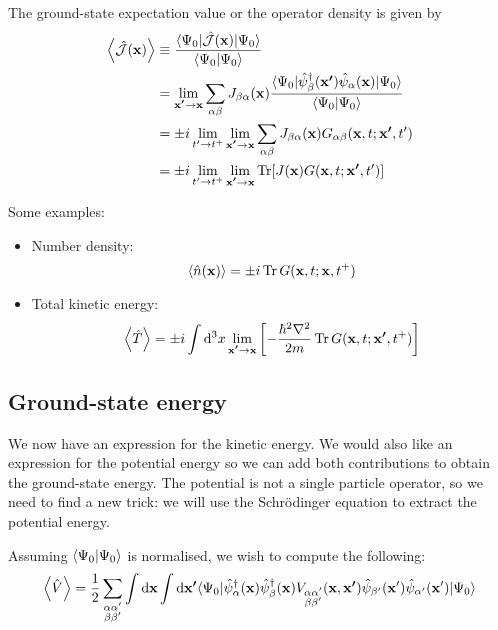The ground-state expectation value or the operator density is given by
\begin{align*}
\expval{\hat{\mathcal{J}}(\vec{x})} &\equiv \frac{\braket[\hat{\mathcal{J}}(\vec{x})]{\Psi_0}{\Psi_0}}{\braket{\Psi_0}{\Psi_0}} \\
&= \lim_{\vec{x'}\to \vec{x}}\sum_{\alpha\beta}J_{\beta\alpha}(\vec{x}) \frac{\braket[\hat{\psi}^\dagger_\beta(\vec{x'})\hat{\psi}_\alpha(\vec{x})]{\Psi_0}{\Psi_0}}{\braket{\Psi_0}{\Psi_0}} \\
&= \pm i \lim_{t'\to t^+}\lim_{\vec{x'}\to \vec{x}} \sum_{\alpha\beta}J_{\beta\alpha}(\vec{x})G_{\alpha\beta}(\vec{x},t; \vec{x'},t') \\
&=  \pm i \lim_{t'\to t^+}\lim_{\vec{x'}\to \vec{x}} \Tr[J(\vec{x})G(\vec{x},t; \vec{x'},t')]
\end{align*}

Some examples:
\begin{itemize}
\item Number density:
\[ \left\langle \hat{n}(\bm{\mathrm{x}}) \right\rangle = \pm i\operatorname{Tr} G(\bm{\mathrm{x}},t;\bm{\mathrm{x}},t^+) \]
\item Total kinetic energy:
\[ \left\langle \hat{T} \right\rangle = \pm i \int \operatorname{d \!}{^3x}\lim_{\bm{\mathrm{x'}}\to \bm{\mathrm{x}}}\left[- \frac{\hbar^2\nabla^2}{2m}\operatorname{Tr} G(\bm{\mathrm{x}},t;\bm{\mathrm{x'}},t^+)\right] \]
\end{itemize}

\subsection{Ground-state energy}
We now have an expression for the kinetic energy. We would also like an expression for the potential energy so we can add both contributions to obtain the ground-state energy. The potential is not a single particle operator, so we need to find a new trick: we will use the Schrödinger equation to extract the potential energy.

Assuming $\braket{\Psi_0}{\Psi_0}$ is normalised, we wish to compute the following:
\begin{align*}
\expval{\hat{V}} = \frac{1}{2} \sum_{\substack{\alpha \alpha' \\ \beta \beta'}}\int \diff{\vec{x}}\int \diff{\vec{x'}} \braket[\hat{\psi}_{\alpha}^\dagger(\vec{x})\hat{\psi}^\dagger_\beta(\vec{x})V_{\substack{\alpha\alpha' \\ \beta \beta'}}(\vec{x}, \vec{x'})\hat{\psi}_{\beta'}(\vec{x}')\hat{\psi}_{\alpha'}(\vec{x}')]{\Psi_0}{\Psi_0}
\end{align*}

